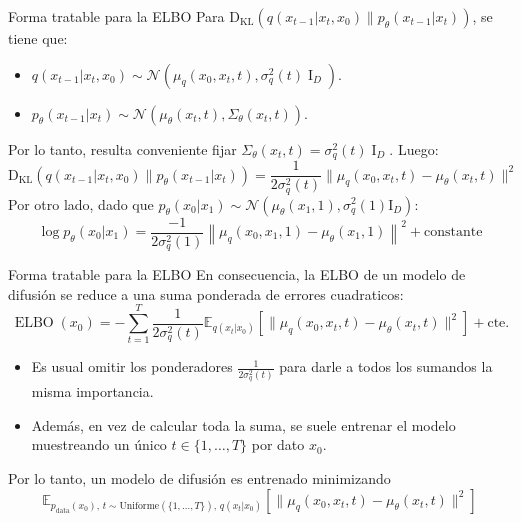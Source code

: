 \documentclass{beamer}
\begin{document}
\begin{frame}{Forma tratable para la ELBO}
    Para $\operatorname{D_{KL}}\left(q(x_{t-1}|x_t,x_0)\|p_\theta(x_{t-1}|x_t)\right)$, se tiene que:
    \begin{itemize}
        \item $q(x_{t-1}|x_t,x_0)\sim\mathcal{N}(\mu_q(x_0,x_t,t),\sigma_q^2(t)\operatorname{I}_D)$.
        \item $p_\theta(x_{t-1}|x_t)\sim\mathcal{N}\left(\mu_\theta(x_t,t),\Sigma_\theta(x_t,t)\right)$.
    \end{itemize}
    Por lo tanto, resulta conveniente fijar $\Sigma_\theta(x_t,t)=\sigma_q^2(t)\operatorname{I}_D$. Luego:
    \begin{equation*}
        \operatorname{D_{KL}}\left(q(x_{t-1}|x_t,x_0)\|p_\theta(x_{t-1}|x_t)\right)
        = \frac{1}{2\sigma_q^2(t)}\|\mu_q(x_0,x_t,t)-\mu_\theta(x_t,t)\|^2
    \end{equation*}
    Por otro lado, dado que $p_\theta(x_0|x_1)\sim\mathcal{N}(\mu_\theta(x_1,1),\sigma_q^2(1)\text{I}_D)$:
    \begin{equation*}
        \log p_\theta(x_0|x_1) = \frac{-1}{2\sigma_q^2(1)}\left\|\mu_q(x_0,x_1,1)-\mu_\theta(x_1,1)\right\|^2+\text{constante}
    \end{equation*}
\end{frame}

\begin{frame}{Forma tratable para la ELBO}
    En consecuencia, la ELBO de un modelo de difusión se reduce a una suma ponderada de errores cuadraticos:
    \begin{equation*}
        \operatorname{ELBO}(x_0) =
        - \sum_{t=1}^T \frac{1}{2\sigma_q^2(t)}\mathbb{E}_{q(x_t|x_0)}\left[\|\mu_q(x_0,x_t,t)-\mu_\theta(x_t,t)\|^2\right]+\text{cte.}
    \end{equation*}
    \vspace{-0.5cm}
    \begin{itemize}
        \item Es usual omitir los ponderadores $\frac{1}{2\sigma_q^2(t)}$ para darle a todos los sumandos la misma importancia.
        \item Además, en vez de calcular toda la suma, se suele entrenar el modelo muestreando un único $t\in\{1,\ldots,T\}$ por dato $x_0$.
    \end{itemize}
    Por lo tanto, un modelo de difusión es entrenado minimizando
    \begin{equation*}
        \mathbb{E}_{p_\text{data}(x_0),\,t\sim\text{Uniforme}(\{1,\ldots,T\}),\,q(x_t|x_0)}\left[\|\mu_q(x_0,x_t,t)-\mu_\theta(x_t,t)\|^2\right]
    \end{equation*}
\end{frame}
\end{document}
